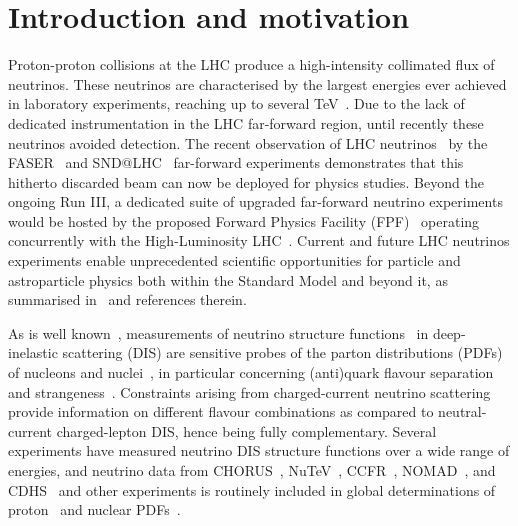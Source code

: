 \section{Introduction and motivation}
\label{sec:introduction}

Proton-proton collisions at the LHC produce a high-intensity collimated flux of neutrinos.
%
These neutrinos are characterised by the largest energies ever achieved in laboratory experiments,
reaching up to several TeV~\cite{Kling:2021gos}.
%
Due to the lack of dedicated instrumentation in the LHC far-forward region,
until recently these neutrinos avoided detection.
%
The recent observation of LHC neutrinos~\cite{FASER:2023zcr,SNDLHC:2023pun,CERN-FASER-CONF-2023-002} by the
  FASER~\cite{FASER:2019dxq,FASER:2022hcn} and SND@LHC~\cite{SHiP:2020sos,SNDLHC:2022ihg} far-forward experiments
demonstrates that this hitherto discarded beam can now be deployed for physics studies.
%
Beyond the ongoing Run III, a dedicated suite of upgraded far-forward
neutrino experiments would be hosted by the proposed
Forward Physics Facility (FPF)~\cite{Anchordoqui:2021ghd,Feng:2022inv} operating
concurrently with the High-Luminosity LHC~\cite{Azzi:2019yne,Cepeda:2019klc}.
%
Current and future LHC neutrinos experiments enable unprecedented scientific opportunities
for particle and astroparticle physics both within the Standard Model and beyond it,
as summarised in~\cite{Anchordoqui:2021ghd,Feng:2022inv}
and references therein.

As is well known~\cite{Conrad:1997ne,Mangano:2001mj},
measurements of neutrino structure functions~\cite{Candido:2023utz} in deep-inelastic scattering
(DIS) are sensitive probes of the parton distributions (PDFs)
of nucleons and nuclei~\cite{Ethier:2020way,Gao:2017yyd,Kovarik:2019xvh},  in particular
concerning (anti)quark  flavour separation and
strangeness~\cite{NuTeV:2007uwm,CCFR:1994ikl,Faura:2020oom,Alekhin:2014sya}.
%
Constraints arising from charged-current neutrino scattering provide information on
different flavour combinations as compared to neutral-current charged-lepton DIS,
hence being fully complementary.
%
Several  experiments have measured neutrino
DIS structure functions over a wide range of energies, and neutrino data
from CHORUS~\cite{CHORUS:2005cpn}, NuTeV~\cite{NuTeV:2001dfo},
CCFR~\cite{Yang:2000ju}, NOMAD~\cite{NOMAD:2013hbk}, and CDHS~\cite{Berge:1989hr}
and other experiments is routinely  included in global
determinations of proton~\cite{NNPDF:2021njg,Hou:2019efy,Bailey:2020ooq} and nuclear
PDFs~\cite{Eskola:2021nhw,AbdulKhalek:2022fyi,Muzakka:2022wey}.

